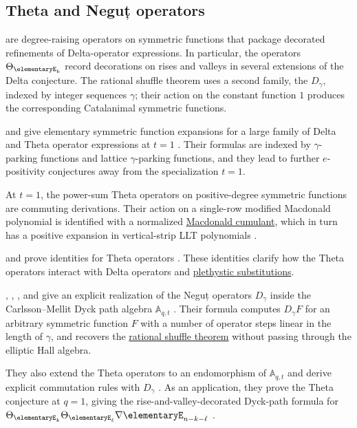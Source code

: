 \subsection[dhThetaNegut]{Theta and Neguț operators}

 are degree-raising operators on symmetric functions that
package decorated refinements of Delta-operator expressions.  In particular,
the operators $\Theta_{\elementaryE_k}$ record decorations on rises and valleys
in several extensions of the Delta conjecture.  The rational shuffle theorem
uses a second family, the  $D_\gamma$, indexed by
integer sequences $\gamma$; their action on the constant function $1$
produces the corresponding Catalanimal symmetric functions.

 and  give elementary symmetric
function expansions for a large family of Delta and Theta operator expressions
at $t=1$ \cite{IraciRomero2024DeltaTheta}.  Their formulas are indexed by
$\gamma$-parking functions and lattice $\gamma$-parking functions, and they
lead to further $e$-positivity conjectures away from the specialization
$t=1$.

At $t=1$, the power-sum Theta operators on positive-degree symmetric
functions are commuting derivations.  Their action on a single-row modified
Macdonald polynomial is identified with a normalized
\hyperref[singleRowMacdonaldCumulantLLTPositivity]{Macdonald cumulant}, which
in turn has a positive expansion in vertical-strip LLT polynomials
\cite[Thms.~1.2--1.3]{HaglundTewari2026x}.

 and  prove identities for Theta
operators \cite{DAdderioRomero2020x}.  These identities clarify how the Theta
operators interact with Delta operators and \hyperref[plethysm]{plethystic substitutions}.

, ,
, and  give an explicit
realization of the Neguț operators $D_\gamma$ inside the Carlsson--Mellit
Dyck path algebra $\mathbb{A}_{q,t}$
\cite[Thms.~4.11 and~4.20]{DAdderioInterdonatoIraciPagaria2026x}.  Their
formula computes $D_\gamma F$ for an arbitrary symmetric function $F$ with a
number of operator steps linear in the length of $\gamma$, and recovers the
\hyperref[rationalShuffle]{rational shuffle theorem} without passing through
the elliptic Hall algebra.

They also extend the Theta operators to an endomorphism of
$\mathbb{A}_{q,t}$ and derive explicit commutation rules with $D_\gamma$
\cite[Thms.~5.1, 5.12, and~5.14]{DAdderioInterdonatoIraciPagaria2026x}.
As an application, they prove the Theta conjecture at $q=1$, giving the
rise-and-valley-decorated Dyck-path formula for
$\Theta_{\elementaryE_k}\Theta_{\elementaryE_\ell}
\nabla \elementaryE_{n-k-\ell}$
\cite[Thm.~6.1]{DAdderioInterdonatoIraciPagaria2026x}.

